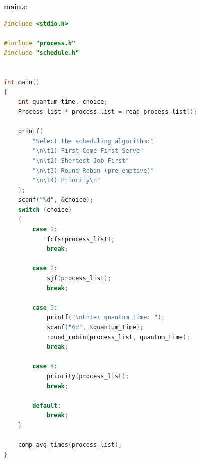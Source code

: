 \documentclass[13pt,oneside]{book}
\begin{document}
\Large\textbf{main.c}
\small
\begin{lstlisting}[language=C]
#include <stdio.h>

#include "process.h"
#include "schedule.h"


int main()
{
	int quantum_time, choice;
	Process_list * process_list = read_process_list();

	printf(
		"Select the scheduling algorithm:"
		"\n\t1) First Come First Serve"
		"\n\t2) Shortest Job First"
		"\n\t3) Round Robin (pre-emptive)"
		"\n\t4) Priority\n"
	);
	scanf("%d", &choice);
	switch (choice)
	{
		case 1:
			fcfs(process_list);
			break;

		case 2:
			sjf(process_list);
			break;
		
		case 3:
			printf("\nEnter quantum time: ");
			scanf("%d", &quantum_time);
			round_robin(process_list, quantum_time);
			break;

		case 4:
			priority(process_list);
			break;

		default:
			break;
	}

	comp_avg_times(process_list);
}

\end{lstlisting}
\end{document}

